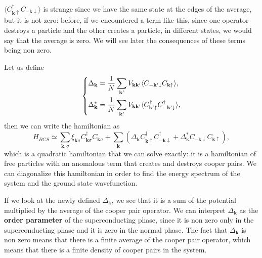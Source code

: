 \(\langle C^{\dagger}_{\mathbf{k} \uparrow} C_{-\mathbf{k} \downarrow} \rangle\) is strange since we have the same state at the edges of the average, but it is not zero: before, if we encountered a term like this, since one operator destroys a particle and the other creates a particle, in different states, we would say that the average is zero. We will see later the consequences of these terms being non zero.

Let us define
\[
    \begin{dcases}
        \Delta_{\mathbf{k}} = \frac{1}{N} \sum_{\mathbf{k}^{\prime}} V_{\mathbf{k}\mathbf{k}'} \langle C_{-\mathbf{k}^{\prime} \downarrow} C_{\mathbf{k} \uparrow} \rangle, \\
        \Delta_{\mathbf{k}}^* = \frac{1}{N} \sum_{\mathbf{k}^{\prime}} V_{\mathbf{k}\mathbf{k}'} \langle C^{\dagger}_{\mathbf{k}^{\prime} \uparrow} C^{\dagger}_{-\mathbf{k}^{\prime} \downarrow} \rangle,
    \end{dcases}
\]
then we can write the hamiltonian as
\[
    H_{BCS} \simeq \sum_{\mathbf{k}, \sigma} \xi_{\mathbf{k}\sigma} C^{\dagger}_{\mathbf{k} \sigma} C_{\mathbf{k} \sigma} + \sum_{\mathbf{k}} (\Delta_{\mathbf{k}} C^{\dagger}_{\mathbf{k} \uparrow} C^{\dagger}_{-\mathbf{k} \downarrow} + \Delta_{\mathbf{k}}^* C_{-\mathbf{k} \downarrow} C_{\mathbf{k} \uparrow}),
\]
which is a quadratic hamiltonian that we can solve exactly: it is a hamiltonian of free particles with an anomalous term that creates and destroys cooper pairs. We can diagonalize this hamiltonian in order to find the energy spectrum of the system and the ground state wavefunction.

If we look at the newly defined \(\Delta_{\mathbf{k}}\), we see that it is a sum of the potential multiplied by the average of the cooper pair operator. We can interpret \(\Delta_{\mathbf{k}}\) as the \textbf{order parameter} of the superconducting phase, since it is non zero only in the superconducting phase and it is zero in the normal phase. The fact that \(\Delta_{\mathbf{k}}\) is non zero means that there is a finite average of the cooper pair operator, which means that there is a finite density of cooper pairs in the system.

